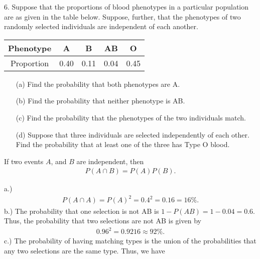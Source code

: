 \documentclass{report}
\begin{document}
    \pagebreak \bigbreak \noindent 
    \begin{mdframed}
        6. Suppose that the proportions of blood phenotypes in a particular population are as given in the table below. Suppose, further, that the phenotypes of two randomly selected individuals are independent of each another.

        \begin{center}
            \begin{tabular}{|c|c|c|c|c|}
                \hline
                Phenotype & A & B & AB & O \\
                \hline
                Proportion & 0.40 & 0.11 & 0.04 & 0.45 \\
                \hline
            \end{tabular}
        \end{center}

        \begin{itemize}
            \item[(a)] Find the probability that both phenotypes are A.
            \item[(b)] Find the probability that neither phenotype is AB.
            \item[(c)] Find the probability that the phenotypes of the two individuals match.
            \item[(d)] Suppose that three individuals are selected independently of each other. Find the probability that at least one of the three has Type O blood.
        \end{itemize}
    \end{mdframed}
    \bigbreak \noindent 
    \begin{remark}
       If two events $A$, and $B$ are independent, then 
       \begin{align*}
           P(A\cap B) = P(A)P(B)
       .\end{align*}
    \end{remark}
    \bigbreak \noindent 
    a.)
    \begin{align*}
        P(A \cap A) = P(A)^{2} = 0.4^{2} = 0.16 = 16\%
    .\end{align*}
    \bigbreak \noindent 
    b.) The probability that one selection is not AB is $1-P(AB) = 1-0.04 = 0.6 $. Thus, the probability that two selections are not AB is given by
    \begin{align*}
        0.96^{2} = 0.9216 \approx 92\%
    .\end{align*}
    \bigbreak \noindent 
    c.) The probability of having matching types is the union of the probabilities that any two selections are the same type. Thus, we have
\end{document}
